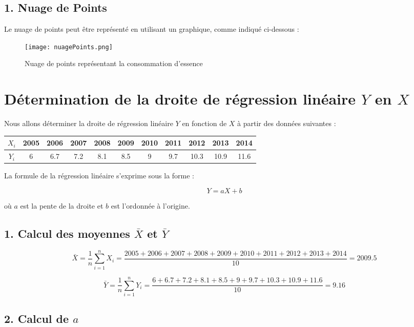 \documentclass[12pt]{article}
\begin{document}
\subsection*{1. Nuage de Points}
Le nuage de points peut être représenté en utilisant un graphique, comme indiqué ci-dessous :
\newpage
\begin{figure}[h]
    \centering
   \texttt{[image: nuagePoints.png]} %
    \caption{Nuage de points représentant la consommation d'essence}
    \label{fig:nuage_points}
\end{figure}

\section*{Détermination de la droite de régression linéaire \(Y\) en \(X\)}

Nous allons déterminer la droite de régression linéaire \(Y\) en fonction de \(X\) à partir des données suivantes :

\begin{table}[h]
    \centering
    \begin{tabular}{|c|c|c|c|c|c|c|c|c|c|c|}
        \hline
        \(X_{i}\) & 2005 & 2006 & 2007 & 2008 & 2009 & 2010 & 2011 & 2012 & 2013 & 2014 \\
        \hline
        \(Y_{i}\) & 6 & 6.7 & 7.2 & 8.1 & 8.5 & 9 & 9.7 & 10.3 & 10.9 & 11.6 \\
        \hline
    \end{tabular}
\end{table}

La formule de la régression linéaire s'exprime sous la forme :

\[
Y = aX + b
\]

où \(a\) est la pente de la droite et \(b\) est l'ordonnée à l'origine.

\subsection*{1. Calcul des moyennes \(\bar{X}\) et \(\bar{Y}\)}

\[
\bar{X} = \frac{1}{n} \sum_{i=1}^{n} X_i = \frac{2005 + 2006 + 2007 + 2008 + 2009 + 2010 + 2011 + 2012 + 2013 + 2014}{10} = 2009.5
\]

\[
\bar{Y} = \frac{1}{n} \sum_{i=1}^{n} Y_i = \frac{6 + 6.7 + 7.2 + 8.1 + 8.5 + 9 + 9.7 + 10.3 + 10.9 + 11.6}{10} = 9.16
\]

\subsection*{2. Calcul de \(a\)}
\end{document}
